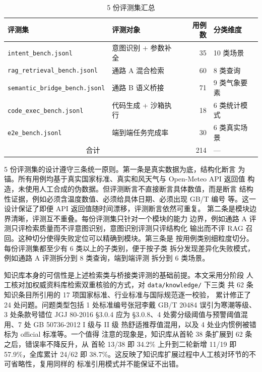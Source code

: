 \documentclass[a4paper]{article}
\newcommand{\song}{\CJKfamily{song}}
\theoremstyle{definition}
\theoremstyle{plain}
\theoremstyle{remark}
\begin{document}
\begin{table}[H]
    \centering
    \caption{5 份评测集汇总}
    \label{tab:dataset-overview}
    \song\fontsize{9pt}{12pt}\selectfont
    \renewcommand{\arraystretch}{0.95}
    \begin{tabular}{llrl}
        \toprule
        评测集 & 评测对象 & 用例数 & 分类维度 \\
        \midrule
        \texttt{intent\_bench.jsonl} & 意图识别 + 参数补全 & 35 & 10 类场景 \\
        \texttt{rag\_retrieval\_bench.jsonl} & 通路 A 混合检索 & 60 & 8 类查询 \\
        \texttt{semantic\_bridge\_bench.jsonl} & 通路 B 语义桥接 & 71 & 9 类气象要素 \\
        \texttt{code\_exec\_bench.jsonl} & 代码生成 + 沙箱执行 & 18 & 6 类统计模式 \\
        \texttt{e2e\_bench.jsonl} & 端到端任务完成率 & 30 & 6 类真实场景 \\
        \midrule
        \multicolumn{2}{c}{合计} & 214 & --- \\
        \bottomrule
    \end{tabular}
\end{table}

5 份评测集的设计遵守三条统一原则。第一条是真实数据为底，结构化断言
为锚。所有用例均基于真实国家标准、真实和风天气与 Open-Meteo API 返回值
构造，未使用人工合成的伪数据。但评测断言不直接断言具体数值，而是断言
结构性证据，例如必须含温度数值、必须给具体日期、必须出现 GB/T 编号
等。这一设计保证了即便 API 返回值随时间漂移，评测断言依然可重复。
第二条是模块边界清晰，评测互不重叠。每份评测集只针对一个模块的能力
边界，例如通路 A 评测只评检索质量而不评意图识别，意图识别评测只评结构化
输出而不评 RAG 召回。这种切分使得失败定位可以精确到模块。第三条是
按用例类别细粒度切分。每份评测集都至少有 6 类以上的子类别，便于按子类
拆分发现差异化失败模式，例如通路 A 评测拆分到 8 类查询，端到端评测
拆分到 6 类场景。

知识库本身的可信性是上述检索类与桥接类评测的基础前提。本文采用分阶段
人工核对加权威资料库检索双重核验的方式，对 \texttt{data/knowledge/} 下三类
共 62 条知识条目所引用的 17 项国家标准、行业标准与国际规范逐一校验，
累计修正了 24 处问题。问题类型包括 1 处标准编号张冠李戴
GB/T 20484 误引为寒潮等级、3 处条款号错位 JGJ 80-2016 §3.0.4 应为
§3.0.8、4 处雾分级阈值与预警阈值混用、7 处 GB 50736-2012 I 级与 II 级
热舒适推荐值混用，以及 4 处业内惯例被错标为 official 标准等。一个值得
注意的现象是，知识库从首轮 38 条扩展到 62 条之后，错误率不降反升，从
首轮 13/38 即 34.2\% 上升到二轮新增 11/19 即 57.9\%，全库累计 24/62 即
38.7\%。这反映了知识库扩展过程中人工核对环节的不可省略性，复用同样的
标准引用模式并不能保证不出错。
\end{document}
